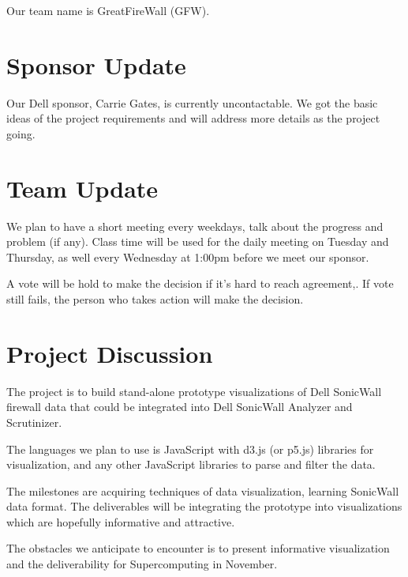 \documentclass[paper=a4, fontsize=11pt]{scrartcl} %
\begin{document}
\maketitle %

Our team name is GreatFireWall (GFW).

\section{Sponsor Update} %
\label{sec:sponsor_update}
Our Dell sponsor, Carrie Gates, is currently uncontactable.
We got the basic ideas of the project requirements and will address more details as the project going.


\section{Team Update} %
\label{sec:team_update}
We plan to have a short meeting every weekdays, talk about the progress and problem (if any). Class time will be used for the daily meeting on Tuesday and Thursday, as well every Wednesday at 1:00pm before we meet our sponsor.

A vote will be hold to make the decision if it's hard to reach agreement,. If vote still fails, the person who takes action will make the decision.


\section{Project Discussion} %
\label{sec:project_discussion}
The project is to build stand-alone prototype visualizations of Dell SonicWall firewall data that could be integrated into Dell SonicWall Analyzer and Scrutinizer.

The languages we plan to use is JavaScript with d3.js (or p5.js) libraries for visualization, and any other JavaScript libraries to parse and filter the data.

The milestones are acquiring techniques of data visualization, learning SonicWall data format. The deliverables will be integrating the prototype into visualizations which are hopefully informative and attractive.

The obstacles we anticipate to encounter is to present informative visualization and the deliverability for Supercomputing in November.
\end{document}
